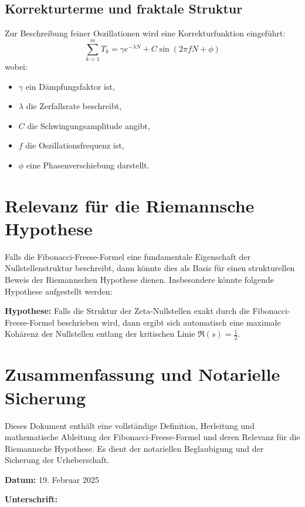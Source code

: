 \documentclass[a4paper,12pt]{article}
\begin{document}
\subsection{Korrekturterme und fraktale Struktur}
Zur Beschreibung feiner Oszillationen wird eine Korrekturfunktion eingeführt:
\begin{equation}
    \sum_{k=1}^{m} T_k = \gamma e^{-\lambda N} + C \sin(2\pi f N + \phi)
\end{equation}
wobei:
\begin{itemize}
    \item \( \gamma \) ein Dämpfungsfaktor ist,
    \item \( \lambda \) die Zerfallsrate beschreibt,
    \item \( C \) die Schwingungsamplitude angibt,
    \item \( f \) die Oszillationsfrequenz ist,
    \item \( \phi \) eine Phasenverschiebung darstellt.
\end{itemize}

\section{Relevanz für die Riemannsche Hypothese}
Falls die Fibonacci-Freese-Formel eine fundamentale Eigenschaft der Nullstellenstruktur beschreibt, dann könnte dies als Basis für einen strukturellen Beweis der Riemannschen Hypothese dienen. Insbesondere könnte folgende Hypothese aufgestellt werden:

\textbf{Hypothese:} Falls die Struktur der Zeta-Nullstellen exakt durch die Fibonacci-Freese-Formel beschrieben wird, dann ergibt sich automatisch eine maximale Kohärenz der Nullstellen entlang der kritischen Linie \( \Re(s) = \frac{1}{2} \).

\section{Zusammenfassung und Notarielle Sicherung}
Dieses Dokument enthält eine vollständige Definition, Herleitung und mathematische Ableitung der Fibonacci-Freese-Formel und deren Relevanz für die Riemannsche Hypothese. Es dient der notariellen Beglaubigung und der Sicherung der Urheberschaft.

\noindent \textbf{Datum:} 19. Februar 2025

\noindent \textbf{Unterschrift:} \underline{\hspace{5cm}}
\end{document}
